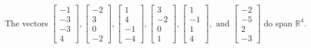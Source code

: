 \begin{exercise}
\begin{exerciseStatement}
  \end{exerciseStatement}
  \begin{exerciseAnswer}
   The vectors \(\left[\begin{array}{r}
-1 \\
-3 \\
-3 \\
4
\end{array}\right] , \left[\begin{array}{r}
-2 \\
3 \\
0 \\
-2
\end{array}\right] , \left[\begin{array}{r}
1 \\
4 \\
-1 \\
-4
\end{array}\right] , \left[\begin{array}{r}
3 \\
-2 \\
0 \\
1
\end{array}\right] , \left[\begin{array}{r}
1 \\
-1 \\
1 \\
4
\end{array}\right] , \text{ and } \left[\begin{array}{r}
-2 \\
-5 \\
2 \\
-3
\end{array}\right]\) 
  	 do  
	span \(\mathbb{R}^4\).
  


  \end{exerciseAnswer}
\end{exercise}